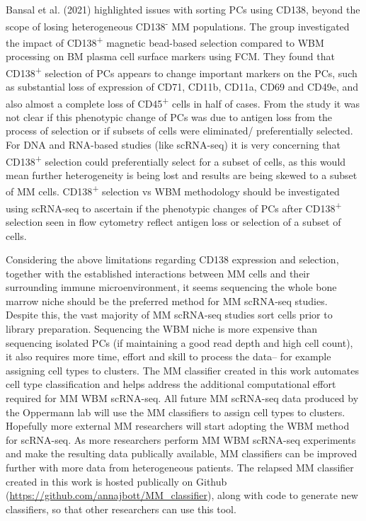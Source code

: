 Bansal et al. (2021) highlighted issues with sorting PCs using CD138, beyond the scope of losing heterogeneous CD138\textsuperscript{-} MM populations.
The group investigated the impact of CD138\textsuperscript{+} magnetic bead-based selection compared to WBM processing on BM plasma cell surface markers using FCM\cite{bansal2021impact}.
They found that CD138\textsuperscript{+} selection of PCs appears to change important markers on the PCs, such as substantial loss of expression of CD71, CD11b, CD11a, CD69 and CD49e, and also almost a complete loss of CD45\textsuperscript{+} cells in half of cases.
From the study it was not clear if this phenotypic change of PCs was due to antigen loss from the process of selection or if subsets of cells were eliminated/ preferentially selected.
For DNA and RNA-based studies (like scRNA-seq) it is very concerning that CD138\textsuperscript{+} selection could preferentially select for a subset of cells, as this would mean further heterogeneity is being lost and results are being skewed to a subset of MM cells.
CD138\textsuperscript{+} selection vs WBM methodology should be investigated using scRNA-seq to ascertain if the phenotypic changes of PCs after CD138\textsuperscript{+} selection seen in flow cytometry reflect antigen loss or selection of a subset of cells.

Considering the above limitations regarding CD138 expression and selection, together with the established interactions between MM cells and their surrounding immune microenvironment, it seems sequencing the whole bone marrow niche should be the preferred method for MM scRNA-seq studies.
Despite this, the vast majority of MM scRNA-seq studies sort cells prior to library preparation.
Sequencing the WBM niche is more expensive than sequencing isolated PCs (if maintaining a good read depth and high cell count), it also requires more time, effort and skill to process the data-- for example assigning cell types to clusters.
The MM classifier created in this work automates cell type classification and helps address the additional computational effort required for MM WBM scRNA-seq.
All future MM scRNA-seq data produced by the Oppermann lab will use the MM classifiers to assign cell types to clusters.
Hopefully more external MM researchers will start adopting the WBM method for scRNA-seq.
As more researchers perform MM WBM scRNA-seq experiments and make the resulting data publically available, MM classifiers can be improved further with more data from heterogeneous patients.
The relapsed MM classifier created in this work is hosted publically on Github (\url{https://github.com/annajbott/MM_classifier}), along with code to generate new classifiers, so that other researchers can use this tool.

